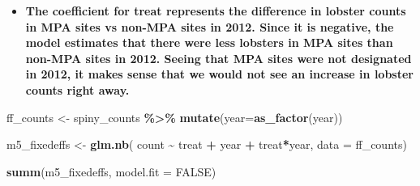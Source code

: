 \documentclass[
]{article}
\newenvironment{Shaded}{\begin{snugshade}}{\end{snugshade}}
\newcommand{\AttributeTok}[1]{\textcolor[rgb]{0.13,0.29,0.53}{#1}}
\newcommand{\ConstantTok}[1]{\textcolor[rgb]{0.56,0.35,0.01}{#1}}
\newcommand{\FunctionTok}[1]{\textcolor[rgb]{0.13,0.29,0.53}{\textbf{#1}}}
\newcommand{\NormalTok}[1]{#1}
\newcommand{\OtherTok}[1]{\textcolor[rgb]{0.56,0.35,0.01}{#1}}
\newcommand{\SpecialCharTok}[1]{\textcolor[rgb]{0.81,0.36,0.00}{\textbf{#1}}}
\providecommand{\tightlist}{%
  \setlength{\itemsep}{0pt}\setlength{\parskip}{0pt}}
\begin{document}
\begin{itemize}
\tightlist
\item
  \textbf{The coefficient for treat represents the difference in lobster
  counts in MPA sites vs non-MPA sites in 2012. Since it is negative,
  the model estimates that there were less lobsters in MPA sites than
  non-MPA sites in 2012. Seeing that MPA sites were not designated in
  2012, it makes sense that we would not see an increase in lobster
  counts right away.}
\end{itemize}

\begin{Shaded}
\begin{Highlighting}[]
\NormalTok{ff\_counts }\OtherTok{\textless{}{-}}\NormalTok{ spiny\_counts }\SpecialCharTok{\%\textgreater{}\%} 
    \FunctionTok{mutate}\NormalTok{(}\AttributeTok{year=}\FunctionTok{as\_factor}\NormalTok{(year))}
    
\NormalTok{m5\_fixedeffs }\OtherTok{\textless{}{-}} \FunctionTok{glm.nb}\NormalTok{(}
\NormalTok{    count }\SpecialCharTok{\textasciitilde{}}
\NormalTok{        treat }\SpecialCharTok{+}
\NormalTok{        year }\SpecialCharTok{+}
\NormalTok{        treat}\SpecialCharTok{*}\NormalTok{year,}
    \AttributeTok{data =}\NormalTok{ ff\_counts)}

\FunctionTok{summ}\NormalTok{(m5\_fixedeffs, }\AttributeTok{model.fit =} \ConstantTok{FALSE}\NormalTok{)}
\end{Highlighting}
\end{Shaded}
\end{document}
